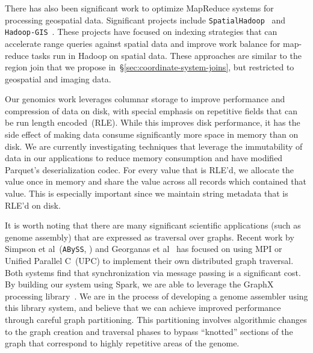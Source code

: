 \documentclass{acm_proc_article-sp}
\begin{document}
There has also been significant work to optimize MapReduce systems for processing geospatial data. Significant
projects include \texttt{SpatialHadoop}~\cite{eldawy15} and \texttt{Hadoop-GIS}~\cite{aji13}. These projects have
focused on indexing strategies that can accelerate range queries against spatial data and improve work balance for
map-reduce tasks run in Hadoop on spatial data. These approaches are similar to the region join that we propose
in~\S\ref{sec:coordinate-system-joins}, but restricted to geospatial and imaging data.

Our genomics work leverages columnar storage to improve performance and compression of data on disk,
with special emphasis on repetitive fields that can be run length encoded~(RLE). While this improves
disk performance, it has the side effect of making data consume significantly more space in memory
than on disk. We are currently investigating techniques that leverage the immutability of data in our
applications to reduce memory consumption and have modified Parquet's deserialization codec. For
every value that is RLE'd, we allocate the value once in memory and share the value across all records which
contained that value. This is especially important since we maintain string metadata that is RLE'd on disk.

It is worth noting that there are many significant scientific applications (such as genome
assembly) that are expressed as traversal over graphs. Recent work by Simpson et al~(\texttt{ABySS},
\cite{simpson09}) and Georganas et al~\cite{georganas14} has focused on using MPI
or Unified Parallel C~(UPC) to implement their own distributed graph traversal. Both systems
find that synchronization via message passing is a significant cost.
By building our system using Spark, we are able to leverage the GraphX processing library~\cite{gonzalez14,
xin13}. We are in the process of developing a genome assembler using this library system, and
believe that we can achieve improved performance through careful graph partitioning. This partitioning involves
algorithmic changes to the graph creation and traversal phases to bypass ``knotted'' sections of the
graph that correspond to highly repetitive areas of the genome.
\end{document}
